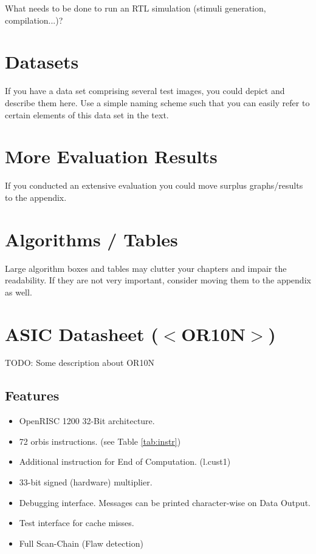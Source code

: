 What needs to be done to run an RTL simulation (stimuli generation,
compilation...)?


\chapter{Datasets}
If you have a data set comprising several test images, you could
depict and describe them here. Use a simple naming scheme such that
you can easily refer to certain elements of this data set in the text.


\chapter{More Evaluation Results}
If you conducted an extensive evaluation you could move surplus
graphs/results to the appendix.


\chapter{Algorithms / Tables}
Large algorithm boxes and tables may clutter your chapters and impair
the readability. If they are not very important, consider moving them
to the appendix as well.


\chapter{ASIC Datasheet ($<$OR10N$>$)}

TODO: Some description about OR10N

\minitoc

\section{Features}
\begin{itemize}
\item OpenRISC 1200 32-Bit architecture.
\item 72 \gls{orbis} instructions. (see Table \ref{tab:instr})
\item Additional instruction for End of Computation. (l.cust1)
\item 33-bit signed (hardware) multiplier.
\item Debugging interface. Messages can be printed character-wise on Data Output.
\item Test interface for cache misses.
\item Full Scan-Chain (Flaw detection)
\end{itemize}

